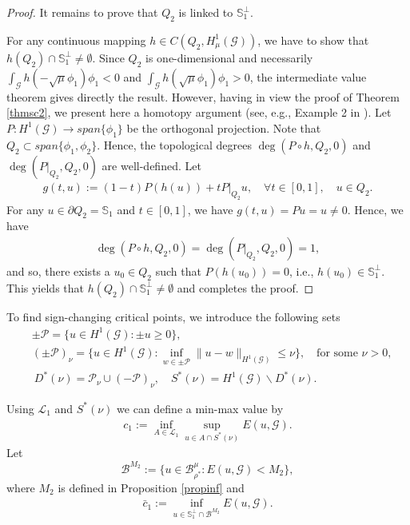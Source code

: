 \documentclass[10pt,a4paper]{article}
\theoremstyle{definition} \theoremstyle{remark}
\numberwithin{equation}{section}
\newcommand{\G}{\mathcal{G}}
\newcommand{\B}{\mathcal{B}}
\newcommand{\K}{\mathcal{K}}
\newcommand{\p}{\mathcal{P}}
\newcommand{\s}{\mathbb{S}}
\newcommand{\cl}{\mathcal{L}}
\begin{document}
\begin{proof}
    It remains to prove that $Q_2$ is linked to $\s_1^\perp$. 
		
		For any continuous mapping $h \in C(Q_2,H^1_\mu(\G))$, we have to show that $h(Q_2) \cap \mathbb{S}_1^\perp \not= \emptyset$. Since $Q_2$ is one-dimensional and  necessarily $\int_{\G} h(- \sqrt{\mu} \phi_1) \phi_1 <0$ and $\int_{\G} h( \sqrt{\mu} \phi_1) \phi_1 >0$, the intermediate value theorem gives directly the result. However, having in view the proof of Theorem \ref{thmsc2}, we present here a homotopy argument (see, e.g., Example 2 in \cite[Chapter II, Section 1]{Cha}). Let $P : H^1(\G) \to span\{\phi_1\}$ be the orthogonal projection. Note that $Q_2 \subset span\{\phi_1,\phi_2\}$. Hence, the topological degrees $\deg(P \circ h,Q_2,0)$ and $\deg(P|_{Q_2},Q_2,0)$ are well-defined. Let
    \begin{align*}
	    g(t,u) := (1-t)P(h(u)) + t P|_{Q_2} u, \quad \forall t \in [0,1], \quad u \in Q_2.
    \end{align*}
    For any $u \in \partial Q_2 = \s_1$ and $t \in [0,1]$, we have $g(t,u) = P u = u \neq 0$. Hence, we have
    \begin{align*}
	    \deg(P \circ h,Q_2,0) = \deg(P|_{Q_2},Q_2,0) = 1,
    \end{align*}
    and so, there exists a $u_0 \in Q_2$ such that $P(h(u_0)) = 0$, i.e., $h(u_0) \in \mathbb{S}_1^\perp$. This yields that $h(Q_2) \cap \mathbb{S}_1^\perp \not= \emptyset$ and completes the proof.
\end{proof}

To find sign-changing critical points, we introduce the following sets
\begin{align*}
   	& \pm \p = \bigl\{u \in H^1(\G): \pm u \geq 0\bigl\},\\
	&  (\pm \p)_\nu = \bigl\{u \in H^1(\G): \inf_{w \in \pm \p}\|u -w\|_{H^1(\G)} \leq \nu\bigr\}, \quad \text{for some } \nu > 0,  \\
	& \ D^*(\nu) = \p_\nu \cup (-\p)_\nu, \quad S^*(\nu) = H^1(\G) \backslash D^*(\nu).
\end{align*}

Using $\cl_1$ and $S^*(\nu)$ we can define a min-max value by
\begin{align*}
	c_1 := \inf_{A \in \cl_1}\sup_{u \in A\cap S^*(\nu)}E(u,\G).
\end{align*}
Let 
\begin{equation}\label{ajout2}
\B^{M_2} := \bigl\{u \in \B_{\rho^*}^\mu: E(u,\G) < M_2\bigl\},   
\end{equation}
where $M_2$ is defined in Proposition \ref{propinf}
and
\begin{align*}
	\bar{c}_1 := \inf_{u\in\s_1^\perp \cap \B^{M_2}}E(u,\G). 
\end{align*}
\end{document}
